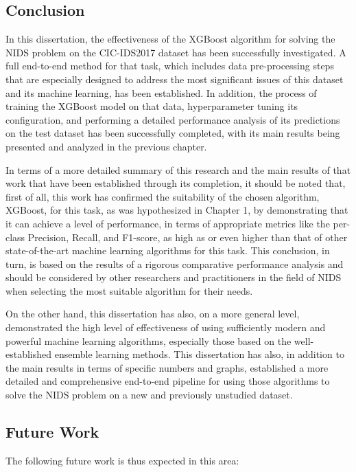 \subsection{Conclusion} 

In this dissertation, the effectiveness of the XGBoost algorithm for solving the NIDS problem on the CIC-IDS2017 dataset has been successfully investigated. A full end-to-end method for that task, which includes data pre-processing steps that are especially designed to address the most significant issues of this dataset and its machine learning, has been established. In addition, the process of training the XGBoost model on that data, hyperparameter tuning its configuration, and performing a detailed performance analysis of its predictions on the test dataset has been successfully completed, with its main results being presented and analyzed in the previous chapter.

In terms of a more detailed summary of this research and the main results of that work that have been established through its completion, it should be noted that, first of all, this work has confirmed the suitability of the chosen algorithm, XGBoost, for this task, as was hypothesized in Chapter 1, by demonstrating that it can achieve a level of performance, in terms of appropriate metrics like the per-class Precision, Recall, and F1-score, as high as or even higher than that of other state-of-the-art machine learning algorithms for this task. This conclusion, in turn, is based on the results of a rigorous comparative performance analysis and should be considered by other researchers and practitioners in the field of NIDS when selecting the most suitable algorithm for their needs.

On the other hand, this dissertation has also, on a more general level, demonstrated the high level of effectiveness of using sufficiently modern and powerful machine learning algorithms, especially those based on the well-established ensemble learning methods. This dissertation has also, in addition to the main results in terms of specific numbers and graphs, established a more detailed and comprehensive end-to-end pipeline for using those algorithms to solve the NIDS problem on a new and previously unstudied dataset.

\subsection{Future Work} 

The following future work is thus expected in this area:

